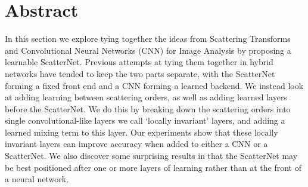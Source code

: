 \section{Abstract}
  In this section we explore tying together the ideas from Scattering Transforms
  and Convolutional Neural Networks (CNN) for Image Analysis by proposing a learnable
  ScatterNet. Previous attempts at tying them together in hybrid 
  networks have tended to keep the two parts separate, with the ScatterNet forming a fixed
  front end and a CNN forming a learned backend. We instead look at adding learning
  between scattering orders, as well as adding learned layers before the
  ScatterNet. We do this by breaking down the scattering orders into single
  convolutional-like layers we call `locally invariant' layers, and adding a learned 
  mixing term to this layer. Our experiments show that these locally invariant
  layers can improve accuracy when added to either a CNN or a ScatterNet.
  We also discover some surprising results in that the ScatterNet may be best
  positioned after one or more layers of learning rather than at the front of a neural
  network.
